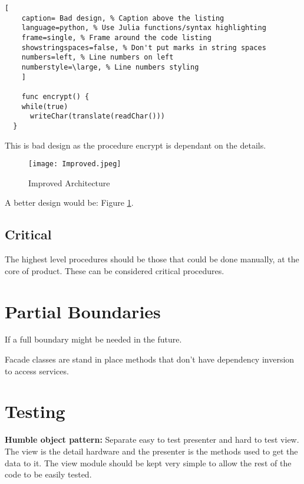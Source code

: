 \documentclass[11pt]{scrartcl} %
\begin{document}
\begin{lstlisting}[
	caption= Bad design, % Caption above the listing
	language=python, % Use Julia functions/syntax highlighting
	frame=single, % Frame around the code listing
	showstringspaces=false, % Don't put marks in string spaces
	numbers=left, % Line numbers on left
	numberstyle=\large, % Line numbers styling
	]

	func encrypt() {
    while(true)
      writeChar(translate(readChar()))
  }

\end{lstlisting}

This is bad design as the procedure encrypt is dependant on the details. \\

\begin{figure}[h] %
	\centering
	\texttt{[image: Improved.jpeg]} %
	\caption{Improved Architecture}
  \label{Improved}
\end{figure}

A better design would be: Figure \ref{Improved}.

\subsection{Critical}

The highest level procedures should be those that could be done manually, at the core of product.
These can be considered critical procedures.

\section{Partial Boundaries}

If a full boundary might be needed in the future.

Facade classes are stand in place methods that don't have dependency inversion to access services.

\section{Testing}

\textbf{Humble object pattern:} Separate easy to test presenter and hard to test view.\\

The view is the detail hardware and the presenter is the methods used to get the data to it. The view
module should be kept very simple to allow the rest of the code to be easily tested.\\
\end{document}
